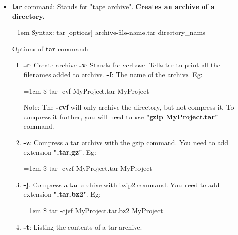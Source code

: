 \begin{flushleft}
\begin{itemize}
	\item \textbf{tar} command: Stands for "tape archive". \textbf{Creates an archive of a directory.}
	\bigskip
	\begin{tcolorbox}[breakable,notitle,boxrule=0pt,colback=pink,colframe=pink]
		\color{black}
		\font=1em
		Syntax: tar [options] archive-file-name.tar directory\_name
		\font=4pt
	\end{tcolorbox}
	Options of \textbf{tar} command:
	\begin{enumerate}
		\item 
		\textbf{-c}: Create archive
		\newline
		\textbf{-v}: Stands for verbose. Tells tar to print all the filenames added to archive.
		\newline
		\textbf{-f}: The name of the archive.
		\newline
		Eg:
		\begin{tcolorbox}[breakable,notitle,boxrule=-0pt,colback=black,colframe=black]
			\color{green}
			\font=1em
			\$ tar -cvf MyProject.tar  MyProject
			\font=4pt
		\end{tcolorbox}		
		\bigskip
		\begin{tcolorbox}[breakable,notitle,boxrule=0pt,colback=yellow,colframe=yellow]
			\color{black}
			Note: The \textbf{-cvf} will only archive the directory, but not compress it. To compress it further, you will need to use \textbf{"gzip MyProject.tar"} command. 
		\end{tcolorbox}
		\item \textbf{-z}: Compress a tar archive with the gzip command. You need to add extension \textbf{".tar.gz"}.
		\newline
		Eg:
		\begin{tcolorbox}[breakable,notitle,boxrule=-0pt,colback=black,colframe=black]
			\color{green}
			\font=1em
			\$ tar -cvzf MyProject.tar  MyProject
			\font=4pt
		\end{tcolorbox}		
		\item \textbf{-j}: Compress a tar archive with bzip2 command. You need to add extension \textbf{".tar.bz2"}.
		\newline
		Eg:
		\begin{tcolorbox}[breakable,notitle,boxrule=-0pt,colback=black,colframe=black]
			\color{green}
			\font=1em
			\$ tar -cjvf MyProject.tar.bz2  MyProject
			\font=4pt
		\end{tcolorbox}		
		\item \textbf{-t}: Listing the contents of a tar archive.

\end{enumerate}
\end{itemize}
\end{flushleft}
